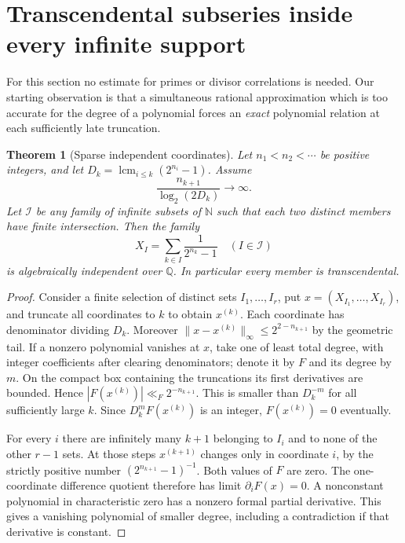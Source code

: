 \documentclass[11pt,letterpaper]{article}
\newtheorem{theorem}{Theorem}[section]
\newcommand{\Q}{\mathbb Q}
\newcommand{\N}{\mathbb N}
\begin{document}
\section{Transcendental subseries inside every infinite support}\label{sec:lacunary}
For this section no estimate for primes or divisor correlations is needed.
Our starting observation is that a simultaneous rational approximation
which is too accurate for the degree of a polynomial forces an
\emph{exact} polynomial relation at each sufficiently late truncation.

\begin{theorem}[Sparse independent coordinates]\label{thm:algfamily}
Let $n_1<n_2<\cdots$ be positive integers, and let
$D_k=\operatorname{lcm}_{i\le k}(2^{n_i}-1)$. Assume
\[
 \frac{n_{k+1}}{\log_2(2D_k)}\longrightarrow\infty.
\]
Let $\mathcal I$ be any family of infinite subsets of $\N$ such that
each two distinct members have finite intersection. Then the family
\[
 X_I=\sum_{k\in I}\frac1{2^{n_k}-1}\quad (I\in\mathcal I)
\]
is algebraically independent over $\Q$. In particular every member
is transcendental.
\end{theorem}
\begin{proof}
Consider a finite selection of distinct sets $I_1,\ldots,I_r$, put
$x=(X_{I_1},\ldots,X_{I_r})$, and truncate all coordinates to $k$ to
obtain $x^{(k)}$. Each coordinate has denominator dividing $D_k$.
Moreover $\|x-x^{(k)}\|_\infty\le2^{2-n_{k+1}}$ by the geometric tail.
If a nonzero polynomial vanishes at $x$, take one of least total degree,
with integer coefficients after clearing denominators; denote it by $F$
and its degree by $m$. On the compact box containing the truncations
its first derivatives are bounded. Hence $|F(x^{(k)})|\ll_F2^{-n_{k+1}}$.
This is smaller than $D_k^{-m}$ for all sufficiently large $k$.
Since $D_k^m F(x^{(k)})$ is an integer, $F(x^{(k)})=0$ eventually.

For every $i$ there are infinitely many $k+1$ belonging to $I_i$
and to none of the other $r-1$ sets. At those steps $x^{(k+1)}$
changes only in coordinate $i$, by the strictly positive number
$(2^{n_{k+1}}-1)^{-1}$. Both values of $F$ are zero. The one-coordinate
difference quotient therefore has limit $\partial_iF(x)=0$.
A nonconstant polynomial in characteristic zero has a nonzero formal
partial derivative. This gives a vanishing polynomial of smaller degree,
including a contradiction if that derivative is constant.
\end{proof}
\end{document}
